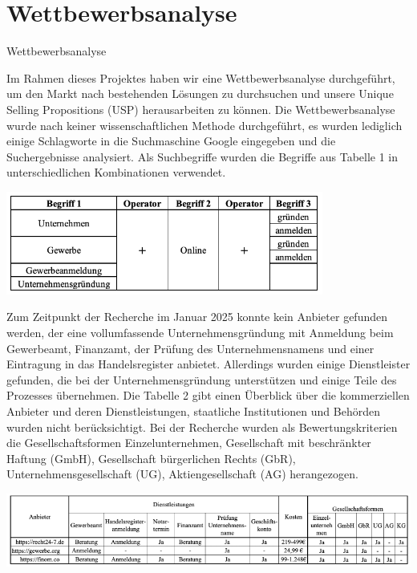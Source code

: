 \newpage

\section{Wettbewerbsanalyse} \label{wettbewerbsanalyse}
Wettbewerbsanalyse

Im Rahmen dieses Projektes haben wir eine Wettbewerbsanalyse durchgeführt, um den Markt nach bestehenden Lösungen zu durchsuchen und unsere Unique Selling Propositions (USP) herausarbeiten zu können. Die Wettbewerbsanalyse wurde nach keiner wissenschaftlichen Methode durchgeführt, es wurden lediglich einige Schlagworte in die Suchmaschine Google eingegeben und die Suchergebnisse analysiert. Als Suchbegriffe wurden die Begriffe aus Tabelle 1 in unterschiedlichen Kombinationen verwendet. 

\includegraphics{"chapter/chapter_3/Tabelle 1.png"}

Zum Zeitpunkt der Recherche im Januar 2025 konnte kein Anbieter gefunden werden, der eine vollumfassende Unternehmensgründung mit Anmeldung beim Gewerbeamt, Finanzamt, der Prüfung des Unternehmensnamens und einer Eintragung in das Handelsregister anbietet. Allerdings wurden einige Dienstleister gefunden, die bei der Unternehmensgründung unterstützen und einige Teile des Prozesses übernehmen. Die Tabelle 2 gibt einen Überblick über die kommerziellen Anbieter und deren Dienstleistungen, staatliche Institutionen und Behörden wurden nicht berücksichtigt. Bei der Recherche wurden als Bewertungskriterien die Gesellschaftsformen Einzelunternehmen, Gesellschaft mit beschränkter Haftung (GmbH), Gesellschaft bürgerlichen Rechts (GbR), Unternehmensgesellschaft (UG), Aktiengesellschaft (AG) herangezogen.

\includegraphics{"chapter/chapter_3/Tabelle 2.png"}

